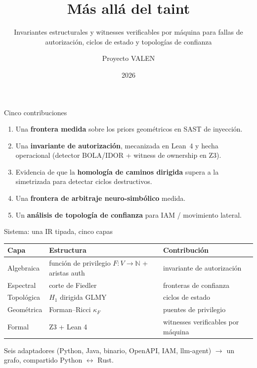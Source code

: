 \documentclass[aspectratio=169,11pt]{beamer}
\title[VALEN]{Más allá del taint}
\subtitle{Invariantes estructurales y witnesses verificables por máquina para fallas
de autorización, ciclos de estado y topologías de confianza}
\author{Proyecto VALEN}
\institute{IR tipada $\cdot$ Lean 4 $\cdot$ GLMY $\cdot$ witnesses Z3}
\date{2026}
\newcommand{\N}{\mathbb{N}}
\begin{document}
\begin{frame}
  \titlepage
\end{frame}

\begin{frame}{Cinco contribuciones}
  \begin{enumerate}
    \item Una \textbf{frontera medida} sobre los priors geométricos en SAST de inyección.
    \item Una \textbf{invariante de autorización}, mecanizada en Lean~4 y hecha
          operacional (detector BOLA/IDOR + witness de ownership en Z3).
    \item Evidencia de que la \textbf{homología de caminos dirigida} supera a la
          simetrizada para detectar ciclos destructivos.
    \item Una \textbf{frontera de arbitraje neuro-simbólico} medida.
    \item Un \textbf{análisis de topología de confianza} para IAM / movimiento lateral.
  \end{enumerate}
\end{frame}

\begin{frame}{Sistema: una IR tipada, cinco capas}
  \begin{center}
  \begin{tabular}{lll}
  \toprule
  \textbf{Capa} & \textbf{Estructura} & \textbf{Contribución} \\
  \midrule
  Algebraica & función de privilegio $F:V\to\N$ + aristas auth & invariante de autorización \\
  Espectral & corte de Fiedler & fronteras de confianza \\
  Topológica & $H_1$ dirigida GLMY & ciclos de estado \\
  Geométrica & Forman--Ricci $\kappa_F$ & puentes de privilegio \\
  Formal & Z3 + Lean 4 & witnesses verificables por máquina \\
  \bottomrule
  \end{tabular}
  \end{center}
  Seis adaptadores (Python, Java, binario, OpenAPI, IAM, llm-agent) $\to$ un grafo,
  compartido Python $\leftrightarrow$ Rust.
\end{frame}
\end{document}
